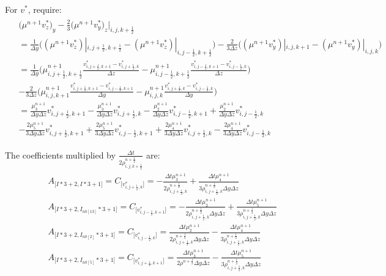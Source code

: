 \documentclass{article}
\numberwithin{equation}{subsection}
\begin{document}
For $v^*$, require:
\begin{align}
\begin{split}
& \Big(\mu^{n+1}v^*_z\Big)_y - \frac{2}{3}\Big(\mu^{n+1}v^*_y\Big)_z|_{i,j,k+\frac{1}{2}} \\
& = \frac{1}{\Delta y} \Big((\mu^{n+1}v^*_z)|_{i,j+\frac{1}{2},k+\frac{1}{2}} - (\mu^{n+1}v^*_z)|_{i,j-\frac{1}{2},k+\frac{1}{2}}\Big) -\frac{2}{3\Delta z}\Big((\mu^{n+1}v^*_y)|_{i,j,k+1} - (\mu^{n+1}v^*_y)|_{i,j,k}\Big) \\
& = \frac{1}{\Delta y}\Big(\mu^{n+1}_{i,j+\frac{1}{2},k+\frac{1}{2}}\frac{v^*_{i,j+\frac{1}{2},k+1}-v^*_{i,j+\frac{1}{2},k}}{\Delta z}-\mu^{n+1}_{i,j-\frac{1}{2},k+\frac{1}{2}}\frac{v^*_{i,j-\frac{1}{2},k+1}-v^*_{i,j-\frac{1}{2},k}}{\Delta z}\Big) \\
& -\frac{2}{3\Delta z}\Big(\mu^{n+1}_{i,j,k+1}\frac{v^*_{i,j+\frac{1}{2},k+1}-v^*_{i,j-\frac{1}{2},k+1}}{\Delta y} - \mu^{n+1}_{i,j,k}\frac{v^*_{i,j+\frac{1}{2},k}-v^*_{i,j-\frac{1}{2},k}}{\Delta y}\Big) \\
& = \frac{\mu^{n+1}_3}{\Delta y \Delta z}v^*_{i,j+\frac{1}{2},k+1} - \frac{\mu^{n+1}_3}{\Delta y \Delta z}v^*_{i,j+\frac{1}{2},k} -\frac{\mu^{n+1}_2}{\Delta y \Delta z}v^*_{i,j-\frac{1}{2},k+1} + \frac{\mu^{n+1}_2}{\Delta y \Delta z}v^*_{i,j-\frac{1}{2},k} \\
& -\frac{2\mu^{n+1}_5}{3\Delta y \Delta z}v^*_{i,j+\frac{1}{2},k+1} + \frac{2\mu^{n+1}_5}{3\Delta y \Delta z}v^*_{i,j-\frac{1}{2},k+1} + \frac{2\mu^{n+1}_4}{3\Delta y \Delta z}v^*_{i,j+\frac{1}{2},k} - \frac{2\mu^{n+1}_4}{3\Delta y \Delta z}v^*_{i,j-\frac{1}{2},k}
\end{split}
\end{align}

The coefficients multiplied by $\frac{\Delta t}{2\rho^{n+\frac{1}{2}}_{i,j,k+\frac{1}{2}}}$ are:
\begin{align}
\begin{split}
& A_{\Big[I*3+2,I*3+1\Big]} = C_{\Big[v^*_{i,j+\frac{1}{2},k}\Big]} = -\frac{\Delta t\mu^{n+1}_3}{2\rho^{n+\frac{1}{2}}_{i,j+\frac{1}{2},k}} + \frac{\Delta t\mu^{n+1}_4}{3\rho^{n+\frac{1}{2}}_{i,j+\frac{1}{2},k}\Delta y \Delta z}\\
& A_{\Big[I*3+2,I_{nb[13]}*3+1\Big]} = C_{\Big[v^*_{i,j-\frac{1}{2},k+1}\Big]} = -\frac{\Delta t\mu^{n+1}_2}{2\rho^{n+\frac{1}{2}}_{i,j+\frac{1}{2},k}\Delta y \Delta z} + \frac{\Delta t\mu^{n+1}_5}{3\rho^{n+\frac{1}{2}}_{i,j+\frac{1}{2},k}\Delta y \Delta z} \\
& A_{\Big[I*3+2,I_{nb[2]}*3+1\Big]} = C_{\Big[v^*_{i,j-\frac{1}{2},k}\Big]} = \frac{\Delta t\mu^{n+1}_2}{2\rho^{n+\frac{1}{2}}_{i,j+\frac{1}{2},k}\Delta y \Delta z} - \frac{\Delta t\mu^{n+1}_4}{3\rho^{n+\frac{1}{2}}_{i,j+\frac{1}{2},k}\Delta y \Delta z}\\
& A_{\Big[I*3+2,I_{nb[5]}*3+1\Big]} = C_{\Big[v^*_{i,j+\frac{1}{2},k+1}\Big]} = \frac{\Delta t\mu^{n+1}_3}{2\rho^{n+\frac{1}{2}}\Delta y \Delta z} - \frac{\Delta t\mu^{n+1}_5}{3\rho^{n+\frac{1}{2}}_{i,j+\frac{1}{2},k}\Delta y \Delta z}
\end{split}
\end{align}
\end{document}
